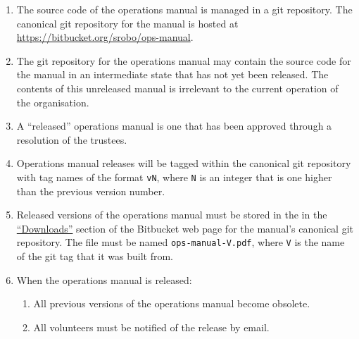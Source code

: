 \begin{enumerate}
\item The source code of the operations manual is managed in a git repository.  The canonical git repository for the manual is hosted at \url{https://bitbucket.org/srobo/ops-manual}.

\item The git repository for the operations manual may contain the source code for the manual in an intermediate state that has not yet been released.  The contents of this unreleased manual is irrelevant to the current operation of the organisation.

\item A ``released'' operations manual is one that has been approved through a resolution of the trustees.

\item Operations manual releases will be tagged within the canonical git repository with tag names of the format \texttt{vN}, where \texttt{N} is an integer that is one higher than the previous version number.

\item Released versions of the operations manual must be stored in the in the \href{https://bitbucket.org/srobo/ops-manual/downloads}{``Downloads''} section of the Bitbucket web page for the manual's canonical git repository.  The file must be named \texttt{ops-manual-V.pdf}, where \texttt{V} is the name of the git tag that it was built from.

\item When the operations manual is released:
  \begin{enumerate}
  \item All previous versions of the operations manual become obsolete.
  \item All volunteers must be notified of the release by email.
  \end{enumerate}
\end{enumerate}

